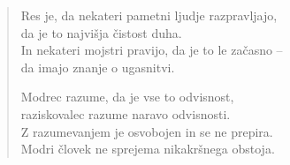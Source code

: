 \begin{verse}
Res je, da nekateri pametni ljudje razpravljajo,\\
da je to najvišja čistost duha.\\
In nekateri mojstri pravijo, da je to le začasno --\\
da imajo znanje o ugasnitvi.

Modrec razume, da je vse to odvisnost,\\
raziskovalec razume naravo odvisnosti.\\
Z razumevanjem je osvobojen in se ne prepira.\\
Modri človek ne sprejema nikakršnega obstoja.


\end{verse}


\clearpage
\begin{verse}


\end{verse}


\clearpage
\begin{verse}


\end{verse}

